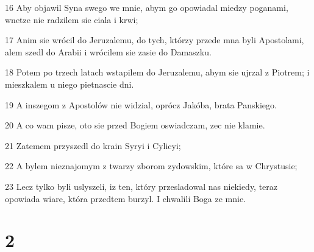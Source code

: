 \par 16 Aby objawil Syna swego we mnie, abym go opowiadal miedzy poganami, wnetze nie radzilem sie ciala i krwi;
\par 17 Anim sie wrócil do Jeruzalemu, do tych, którzy przede mna byli Apostolami, alem szedl do Arabii i wrócilem sie zasie do Damaszku.
\par 18 Potem po trzech latach wstapilem do Jeruzalemu, abym sie ujrzal z Piotrem; i mieszkalem u niego pietnascie dni.
\par 19 A inszegom z Apostolów nie widzial, oprócz Jakóba, brata Panskiego.
\par 20 A co wam pisze, oto sie przed Bogiem oswiadczam, zec nie klamie.
\par 21 Zatemem przyszedl do krain Syryi i Cylicyi;
\par 22 A bylem nieznajomym z twarzy zborom zydowskim, które sa w Chrystusie;
\par 23 Lecz tylko byli uslyszeli, iz ten, który przesladowal nas niekiedy, teraz opowiada wiare, która przedtem burzyl. I chwalili Boga ze mnie.

\chapter{2}

